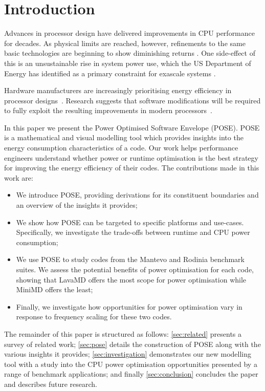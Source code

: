 \section{Introduction} \noindent
Advances in processor design have delivered improvements in CPU performance for decades. As physical limits are reached, however, refinements to the same basic technologies are beginning to show diminishing returns \cite{esmaeilzadeh:2011aa}. 
One side-effect of this is an unsustainable rise in system power use, which the US Department of Energy has identified as a primary constraint for exascale systems \cite{shalf:2011aa}.

Hardware manufacturers are increasingly prioritising energy efficiency in processor designs~\cite{kurd:2014aa}. 
Research suggests that software modifications will be required to fully exploit the resulting improvements in modern processors~\cite{shao:2013aa}.

In this paper we present the Power Optimised Software Envelope (POSE).
POSE is a mathematical and visual modelling tool which provides insights into the energy consumption characteristics of a code.
Our work helps performance engineers understand whether power or runtime optimisation is the best strategy for improving the energy efficiency of their codes.
The contributions made in this work are:
\begin{itemize}
  \item We introduce POSE, providing derivations for its constituent boundaries and an overview of the insights it provides;
  \item We show how POSE can be targeted to specific platforms and use-cases. 
        Specifically, we investigate the trade-offs between runtime and CPU power consumption;
  \item We use POSE to study codes from the Mantevo and Rodinia benchmark suites.
        We assess the potential benefits of power optimisation for each code, showing that LavaMD offers the most scope for power optimisation while MiniMD offers the least;
  \item Finally, we investigate how opportunities for power optimisation vary in response to frequency scaling for these two codes.
\end{itemize}

The remainder of this paper is structured as follows:
\autoref{sec:related} presents a survey of related work; 
\autoref{sec:pose} details the construction of POSE along with the various insights it provides;
\autoref{sec:investigation} demonstrates our new modelling tool with a study into the CPU power optimisation opportunities presented by a range of benchmark applications;
and finally \autoref{sec:conclusion} concludes the paper and describes future research.
